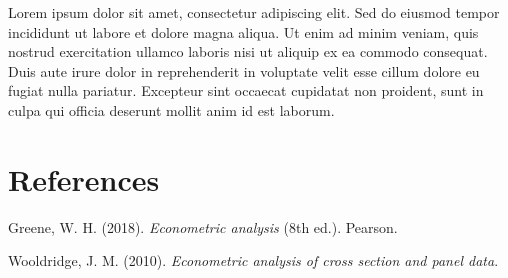 \documentclass[
  11pt,
  a4paper,
  DIV=11,
  numbers=noendperiod]{scrartcl}
\newlength{\cslhangindent}
\newenvironment{CSLReferences}[2] %
 {\begin{list}{}{%
  \setlength{\itemindent}{0pt}
  \setlength{\leftmargin}{0pt}
  \setlength{\parsep}{0pt}
  \ifodd #1
   \setlength{\leftmargin}{\cslhangindent}
   \setlength{\itemindent}{-1\cslhangindent}
  \fi
  \setlength{\itemsep}{#2\baselineskip}}}
 {\end{list}}
\begin{document}
Lorem ipsum dolor sit amet, consectetur adipiscing elit. Sed do eiusmod
tempor incididunt ut labore et dolore magna aliqua. Ut enim ad minim
veniam, quis nostrud exercitation ullamco laboris nisi ut aliquip ex ea
commodo consequat. Duis aute irure dolor in reprehenderit in voluptate
velit esse cillum dolore eu fugiat nulla pariatur. Excepteur sint
occaecat cupidatat non proident, sunt in culpa qui officia deserunt
mollit anim id est laborum.

\newpage{}

\section{References}\label{references}

\label{refs}
\begin{CSLReferences}{1}{0}
Greene, W. H. (2018). \emph{Econometric analysis} (8th ed.). Pearson.

Wooldridge, J. M. (2010). \emph{Econometric analysis of cross section
and panel data}.

\end{CSLReferences}
\end{document}
